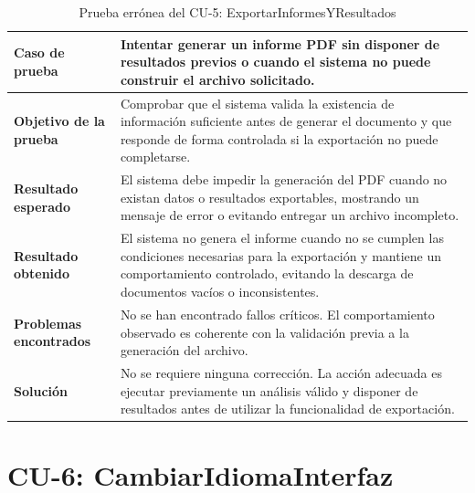 
\begin{table}[H]
\centering
\small
\begin{tabularx}{\textwidth}{|p{}|X|}
\hline
\textbf{Caso de prueba} & Intentar generar un informe PDF sin disponer de resultados previos o cuando el sistema no puede construir el archivo solicitado. \\ \hline
\textbf{Objetivo de la prueba} & Comprobar que el sistema valida la existencia de información suficiente antes de generar el documento y que responde de forma controlada si la exportación no puede completarse. \\ \hline
\textbf{Resultado esperado} & El sistema debe impedir la generación del PDF cuando no existan datos o resultados exportables, mostrando un mensaje de error o evitando entregar un archivo incompleto. \\ \hline
\textbf{Resultado obtenido} & El sistema no genera el informe cuando no se cumplen las condiciones necesarias para la exportación y mantiene un comportamiento controlado, evitando la descarga de documentos vacíos o inconsistentes. \\ \hline
\textbf{Problemas encontrados} & No se han encontrado fallos críticos. El comportamiento observado es coherente con la validación previa a la generación del archivo. \\ \hline
\textbf{Solución} & No se requiere ninguna corrección. La acción adecuada es ejecutar previamente un análisis válido y disponer de resultados antes de utilizar la funcionalidad de exportación. \\ \hline
\end{tabularx}
\caption{Prueba errónea del CU-5: ExportarInformesYResultados}
\label{tab:prueba_erronea_cu5}
\normalsize
\end{table}

\Needspace{0.80\textheight}
\section{CU-6: CambiarIdiomaInterfaz}


